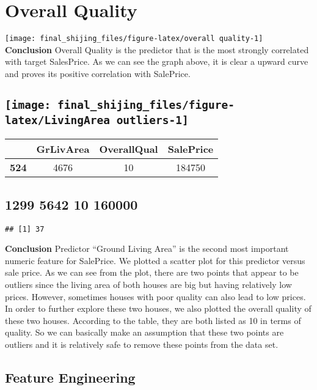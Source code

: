 \documentclass[
]{article}
\begin{document}
\hypertarget{overall-quality}{%
\section{Overall Quality}\label{overall-quality}}

\texttt{[image: final\_shijing\_files/figure-latex/overall quality-1]}
\textbf{Conclusion} Overall Quality is the predictor that is the most
strongly correlated with target SalesPrice. As we can see the graph
above, it is clear a upward curve and proves its positive correlation
with SalePrice.

\hypertarget{section}{%
\subsection{\texorpdfstring{\texttt{[image: final\_shijing\_files/figure-latex/LivingArea outliers-1]}}{}}\label{section}}

\begin{longtable}[]{@{}cccc@{}}
\toprule
~ & GrLivArea & OverallQual & SalePrice\tabularnewline
\midrule
\endhead
\textbf{524} & 4676 & 10 & 184750\tabularnewline
\bottomrule
\end{longtable}

\hypertarget{section-1}{%
\subsection{\texorpdfstring{\textbf{1299} 5642 10
160000}{1299 5642 10 160000}}\label{section-1}}

\begin{verbatim}
## [1] 37
\end{verbatim}

\textbf{Conclusion} Predictor ``Ground Living Area'' is the second most
important numeric feature for SalePrice. We plotted a scatter plot for
this predictor versus sale price. As we can see from the plot, there are
two points that appear to be outliers since the living area of both
houses are big but having relatively low prices. However, sometimes
houses with poor quality can also lead to low prices. In order to
further explore these two houses, we also plotted the overall quality of
these two houses. According to the table, they are both listed as 10 in
terms of quality. So we can basically make an assumption that these two
points are outliers and it is relatively safe to remove these points
from the data set.

\hypertarget{feature-engineering}{%
\subsection{Feature Engineering}\label{feature-engineering}}
\end{document}
